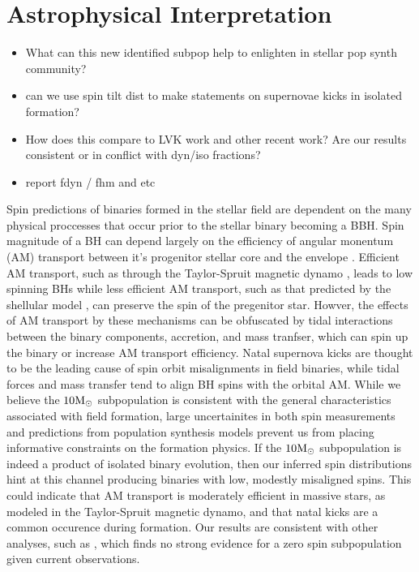 \section{Astrophysical Interpretation} \label{sec:astro}

\begin{itemize}
    \item What can this new identified subpop help to enlighten in stellar pop synth community?
    \item can we use spin tilt dist to make statements on supernovae kicks in isolated formation?
    \item How does this compare to LVK work and other recent work? Are our results consistent or in conflict with dyn/iso fractions?
    \item report fdyn / fhm and etc
\end{itemize}

Spin predictions of binaries formed in the stellar field are dependent on the many physical proccesses that occur prior to the stellar binary becoming a BBH.  Spin magnitude of a BH can depend largely on the efficiency of angular monentum (AM) transport between it's progenitor stellar core and the envelope \citep{2203.02515}. Efficient AM transport, such as through the Taylor-Spruit magnetic dynamo , leads to low spinning BHs while less efficient AM transport, such as that predicted by the shellular model , can preserve the spin of the pregenitor star. Howver, the effects of AM transport by these mechanisms can be obfuscated by tidal interactions between the binary components, accretion, and mass tranfser, which can spin up the binary or increase AM transport efficiency. Natal supernova kicks are thought to be the leading cause of spin orbit misalignments in field binaries, while tidal forces and mass transfer tend to align BH spins with the orbital AM. While we believe the $10{\rm M}_\odot$ subpopulation is consistent with the general characteristics associated with field formation, large uncertainites in both spin measurements and predictions from population synthesis models prevent us from placing informative constraints on the formation physics. If the $10{\rm M}_\odot$ subpopulation is indeed a product of isolated binary evolution, then our inferred spin distributions hint at this channel producing binaries with low, modestly misaligned spins. This could indicate that AM transport is moderately efficient in massive stars, as modeled in the Taylor-Spruit magnetic dynamo, and that natal kicks are a common occurence during formation. Our results are consistent with other analyses, such as \citet{arXiv2205.08574}, which finds no strong evidence for a zero spin subpopulation given current observations. 

